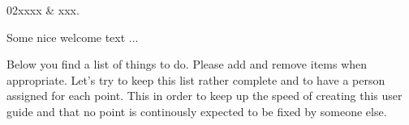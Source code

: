 %
%
 \label{sec:intro}

%
%
\starthistory
  02xxxx & xxx.\\
\stophistory


Some nice welcome text ...


Below you find a list of things to do. Please add and remove items
when appropriate. Let's try to keep this list rather complete and to
have a person assigned for each point. This in order to keep up the
speed of creating this user guide and that no point is continously
expected to be fixed by someone else.
